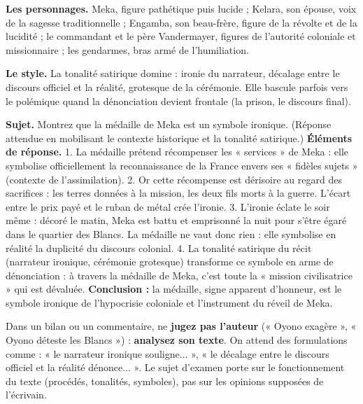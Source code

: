 \documentclass[11pt]{article}
\newcommand{\cle}[1]{{\popxbold\color{popdark}#1}}
\begin{document}
\textbf{Les personnages.} Meka, figure pathétique puis lucide ; Kelara, son épouse, voix de la sagesse traditionnelle ; Engamba, son beau-frère, figure de la révolte et de la lucidité ; le commandant et le père Vandermayer, figures de l'autorité coloniale et missionnaire ; les gendarmes, bras armé de l'humiliation.

\textbf{Le style.} La \cle{tonalité satirique} domine : ironie du narrateur, décalage entre le discours officiel et la réalité, grotesque de la cérémonie. Elle bascule parfois vers le \cle{polémique} quand la dénonciation devient frontale (la prison, le discours final).

\begin{exoresolu}
\textbf{Sujet.} Montrez que la médaille de Meka est un symbole ironique. (Réponse attendue en mobilisant le contexte historique et la tonalité satirique.)
\tcblower
\textbf{Éléments de réponse.} 1. La médaille prétend récompenser les « services » de Meka : elle symbolise officiellement la reconnaissance de la France envers ses « fidèles sujets » (contexte de l'assimilation). 2. Or cette récompense est dérisoire au regard des sacrifices : les terres données à la mission, les deux fils morts à la guerre. L'écart entre le prix payé et le ruban de métal crée l'ironie. 3. L'ironie éclate le soir même : décoré le matin, Meka est battu et emprisonné la nuit pour s'être égaré dans le quartier des Blancs. La médaille ne vaut donc rien : elle symbolise en réalité la duplicité du discours colonial. 4. La tonalité satirique du récit (narrateur ironique, cérémonie grotesque) transforme ce symbole en arme de dénonciation : à travers la médaille de Meka, c'est toute la « mission civilisatrice » qui est dévaluée. \textbf{Conclusion :} la médaille, signe apparent d'honneur, est le symbole ironique de l'hypocrisie coloniale et l'instrument du réveil de Meka.
\end{exoresolu}

\begin{attention}
Dans un bilan ou un commentaire, ne \textbf{jugez pas l'auteur} (« Oyono exagère », « Oyono déteste les Blancs ») : \textbf{analysez son texte}. On attend des formulations comme : « le narrateur ironique souligne... », « le décalage entre le discours officiel et la réalité dénonce... ». Le sujet d'examen porte sur le fonctionnement du texte (procédés, tonalités, symboles), pas sur les opinions supposées de l'écrivain.
\end{attention}
\end{document}
